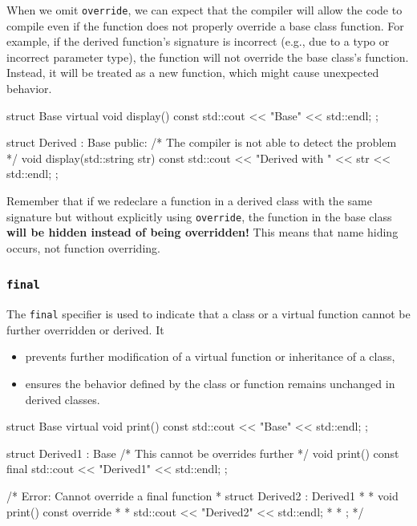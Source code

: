 \documentclass[../main]{subfiles}
\begin{document}
    When we omit \texttt{override}, we can expect that the compiler
will allow the code to compile even if the function does not properly override a base class function. For example, if the derived function's
signature is incorrect (e.g., due to a typo or incorrect parameter type), the function will not override the base class's function. Instead, it will be treated as a new function, which might cause unexpected behavior.
\begin{Code}
struct Base
{
    virtual void display() const
    {
        std::cout << "Base" << std::endl;
    }
};

struct Derived : Base
{
public:
    /* The compiler is not able to detect the problem */
    void display(std::string str) const
    { 
        std::cout << "Derived with " << str << std::endl;
    }
};
\end{Code}

Remember that if we redeclare a function in a derived class with the
same signature but without explicitly using \texttt{override},
the function in the base class \textbf{will be hidden instead of being
overridden!} This means that name hiding occurs, not function overriding.

\subsubsection{\texttt{final}}
The \texttt{final} specifier is used to indicate that a class or a virtual function cannot be further overridden or derived. It
\begin{itemize}
    \item prevents further modification of a virtual function or inheritance of a class,
    \item ensures the behavior defined by the class or function remains unchanged in derived classes.
\end{itemize}

\begin{Code}
struct Base
{
    virtual void print() const
    {
        std::cout << "Base" << std::endl;
    }
};

struct Derived1 : Base
{
    /* This cannot be overrides further */
    void print() const final
    {
        std::cout << "Derived1" << std::endl;
    }
};

/* Error: Cannot override a final function
 * struct Derived2 : Derived1
 * {
 *     void print() const override
 *     {
 *         std::cout << "Derived2" << std::endl;
 *     }
 * };
 */
\end{Code}
\end{document}

